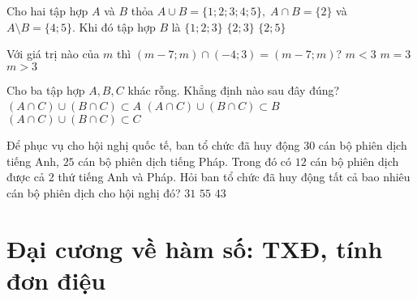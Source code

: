 \begin{ex}%
	Cho hai tập hợp $A$ và $B$ thỏa $A \cup B = \{ 1;2;3;4;5\},\; A\cap B = \{ 2 \}$ và $A \setminus B = \{ 4 ; 5 \}$. Khi đó tập hợp $B$ là
	{\True $\{ 1;2;3 \} $}
	{$ \{ 2;3 \} $}
	{$\{ 2; 5 \} $}
\end{ex}

\begin{ex}%
	Với giá trị nào của $m$ thì $(m-7;m)\cap (-4;3)=(m-7;m)$?
	{$m<3 $}
	{\True $m=3 $}
	{$ m>3$}
\end{ex}
\begin{ex}%
	Cho ba tập hợp $A,B,C$ khác rỗng. Khẳng định nào sau đây đúng?
	{$(A\cap C) \cup (B\cap C) \subset A$}
	{$(A\cap C) \cup (B\cap C) \subset B $}
	{\True $(A\cap C) \cup (B\cap C) \subset C $}
\end{ex}
\begin{ex}%
	Để phục vụ cho hội nghị quốc tế, ban tổ chức đã huy động $30$ cán bộ phiên dịch tiếng Anh, $25$ cán bộ phiên dịch tiếng Pháp. Trong đó có $12$ cán bộ phiên dịch được cả 2 thứ tiếng Anh và Pháp. Hỏi ban tổ chức đã huy động tất cả bao nhiêu cán bộ phiên dịch cho hội nghị đó?
	{$ 31$}
	{$55 $}
	{\True $43 $}
\end{ex}
\section{Đại cương về hàm số: TXĐ, tính đơn điệu}
